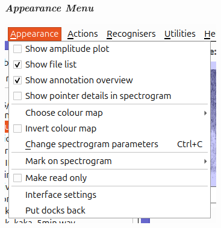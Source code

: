 \documentclass{article}
\begin{document}
\subsubsection{{\em Appearance Menu}}

\begin{center}
\includegraphics[width=.4\textwidth]{Figures/AppearanceMenu}
\end{center}
\end{document}
